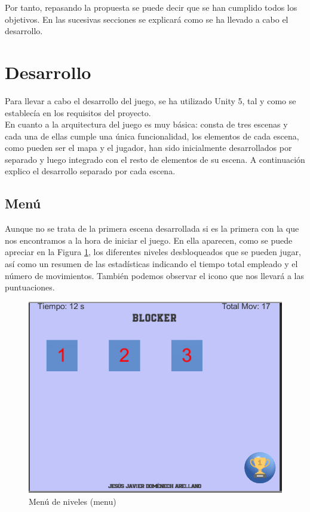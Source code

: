 \documentclass{article}
\begin{document}
Por tanto, repasando la propuesta se puede decir que se han cumplido todos los objetivos. En las sucesivas secciones se explicará como se ha llevado a cabo el desarrollo.
\newpage
\section{Desarrollo}
Para llevar a cabo el desarrollo del juego, se ha utilizado Unity 5, tal y como se establecía en los requisitos del proyecto. \\

En cuanto a la arquitectura del juego es muy básica: consta de tres escenas y cada una de ellas cumple una única funcionalidad, los elementos de cada escena, como pueden ser el mapa y el jugador, han sido inicialmente desarrollados por separado y luego integrado con el resto de elementos de su escena. A continuación explico el desarrollo separado por cada escena.

\subsection{Menú}

Aunque no se trata de la primera escena desarrollada si es la primera con la que nos encontramos a la hora de iniciar el juego. En ella aparecen, como se puede apreciar en la Figura \ref{fig:menu}, los diferentes niveles desbloqueados que se pueden jugar, así como un resumen de las estadísticas indicando el tiempo total empleado y el número de movimientos. También podemos observar el icono que nos llevará a las puntuaciones.\\

\begin{figure}[h!]
\centering
\includegraphics[scale=.4]{menu.png}
\caption{Menú de niveles (menu)}
\label{fig:menu}
\end{figure}
\end{document}
